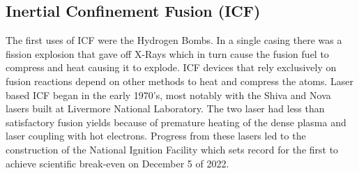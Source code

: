 \documentclass[English]{article}
\begin{document}
\subsection{Inertial Confinement Fusion (ICF)}
The first uses of ICF were the Hydrogen Bombs. In a single casing there was a fission explosion that gave off X-Rays which in turn cause the fusion fuel to compress and heat causing it to explode. ICF devices that rely exclusively on fusion reactions depend on other methods to heat and compress the atoms. Laser based ICF began in the early 1970's, most notably with the Shiva and Nova lasers built at Livermore National Laboratory. The two laser had less than satisfactory fusion yields because of premature heating of the dense plasma and laser coupling with hot electrons. Progress from these lasers led to the construction of the National Ignition Facility which sets record for the first to achieve scientific break-even on December 5 of 2022. 
\end{document}
